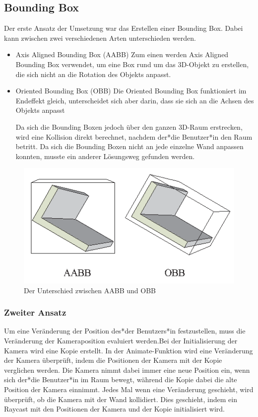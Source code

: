 \subsection{Bounding Box}
Der erste Ansatz der Umsetzung war das Erstellen einer Bounding Box. Dabei kann zwischen zwei verschiedenen Arten unterschieden werden. 

\begin{itemize}
    \item Axis Aligned Bounding Box (AABB)
    \newline
    Zum einen werden Axis Aligned Bounding Box verwendet, um eine Box rund um das 3D-Objekt zu erstellen, die sich nicht an die Rotation des Objekts anpasst.
    \item Oriented Bounding Box (OBB)
    \newline
    Die Oriented Bounding Box funktioniert im Endeffekt gleich, unterscheidet sich aber darin, dass sie sich an die Achsen des Objekts anpasst
    
    Da sich die Bounding Boxen jedoch über den ganzen 3D-Raum erstrecken, wird eine Kollision direkt berechnet, nachdem der*die Benutzer*in den Raum betritt. Da sich die Bounding Boxen nicht an jede einzelne Wand anpassen konnten, musste ein anderer Lösungsweg gefunden werden.
\end{itemize}
\begin{figure}
    \centering
    \includegraphics[scale=0.65]{pics/aabb_obb.png}
    \caption{Der Unterschied zwischen AABB und OBB \cite{AABBandOBBPicture}}
    \label{fig:impl:aabb_obb}
\end{figure}


\subsubsection{Zweiter Ansatz}
Um eine Veränderung der Position des*der Benutzers*in festzustellen, muss die Veränderung der Kameraposition evaluiert werden.Bei der Initialisierung der Kamera wird eine Kopie erstellt. In der Animate-Funktion wird eine Veränderung der Kamera überprüft, indem die Positionen der Kamera mit der Kopie verglichen werden. Die Kamera nimmt dabei immer eine neue Position ein, wenn sich der*die Benutzer*in im Raum bewegt, während die Kopie dabei die alte Position der Kamera einnimmt. Jedes Mal wenn eine Veränderung geschieht, wird überprüft, ob die Kamera mit der Wand kollidiert. Dies geschieht, indem ein Raycast mit den Positionen der Kamera und der Kopie initialisiert wird. 
     
